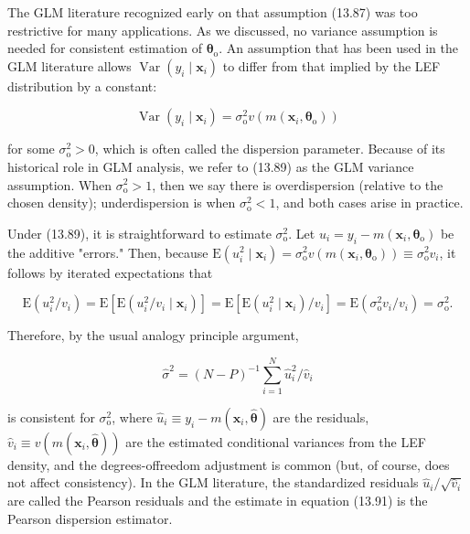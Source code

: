 \documentclass[10pt]{article}
\begin{document}
The GLM literature recognized early on that assumption (13.87) was too restrictive for many applications. As we discussed, no variance assumption is needed for consistent estimation of $\boldsymbol{\theta}_{\mathrm{o}}$. An assumption that has been used in the GLM literature allows $\operatorname{Var}\left(y_{i} \mid \mathbf{x}_{i}\right)$ to differ from that implied by the LEF distribution by a constant:


\begin{equation*}
\operatorname{Var}\left(y_{i} \mid \mathbf{x}_{i}\right)=\sigma_{\mathrm{o}}^{2} v\left(m\left(\mathbf{x}_{i}, \boldsymbol{\theta}_{\mathrm{o}}\right)\right) \tag{13.89}
\end{equation*}


for some $\sigma_{\mathrm{o}}^{2}>0$, which is often called the dispersion parameter. Because of its historical role in GLM analysis, we refer to (13.89) as the GLM variance assumption. When $\sigma_{\mathrm{o}}^{2}>1$, then we say there is overdispersion (relative to the chosen density); underdispersion is when $\sigma_{\mathrm{o}}^{2}<1$, and both cases arise in practice.

Under (13.89), it is straightforward to estimate $\sigma_{\mathrm{o}}^{2}$. Let $u_{i}=y_{i}-m\left(\mathbf{x}_{i}, \boldsymbol{\theta}_{\mathrm{o}}\right)$ be the additive "errors." Then, because $\mathrm{E}\left(u_{i}^{2} \mid \mathbf{x}_{i}\right)=\sigma_{\mathrm{o}}^{2} v\left(m\left(\mathbf{x}_{i}, \boldsymbol{\theta}_{\mathrm{o}}\right)\right) \equiv \sigma_{\mathrm{o}}^{2} v_{i}$, it follows by iterated expectations that


\begin{equation*}
\mathrm{E}\left(u_{i}^{2} / v_{i}\right)=\mathrm{E}\left[\mathrm{E}\left(u_{i}^{2} / v_{i} \mid \mathbf{x}_{i}\right)\right]=\mathrm{E}\left[\mathrm{E}\left(u_{i}^{2} \mid \mathbf{x}_{i}\right) / v_{i}\right]=\mathrm{E}\left(\sigma_{\mathrm{o}}^{2} v_{i} / v_{i}\right)=\sigma_{\mathrm{o}}^{2} . \tag{13.90}
\end{equation*}


Therefore, by the usual analogy principle argument,


\begin{equation*}
\hat{\sigma}^{2}=(N-P)^{-1} \sum_{i=1}^{N} \hat{u}_{i}^{2} / \hat{v}_{i} \tag{13.91}
\end{equation*}


is consistent for $\sigma_{\mathrm{o}}^{2}$, where $\hat{u}_{i} \equiv y_{i}-m\left(\mathbf{x}_{i}, \hat{\boldsymbol{\theta}}\right)$ are the residuals, $\hat{v}_{i} \equiv v\left(m\left(\mathbf{x}_{i}, \hat{\boldsymbol{\theta}}\right)\right)$ are the estimated conditional variances from the LEF density, and the degrees-offreedom adjustment is common (but, of course, does not affect consistency). In the GLM literature, the standardized residuals $\hat{u}_{i} / \sqrt{\hat{v}_{i}}$ are called the Pearson residuals and the estimate in equation (13.91) is the Pearson dispersion estimator.
\end{document}
